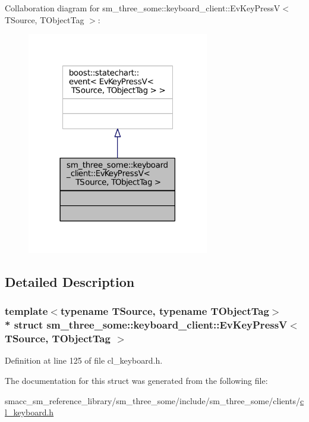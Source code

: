Collaboration diagram for sm\+\_\+three\+\_\+some\+:\+:keyboard\+\_\+client\+:\+:Ev\+Key\+PressV$<$ T\+Source, T\+Object\+Tag $>$\+:
\nopagebreak
\begin{figure}[H]
\begin{center}
\leavevmode
\includegraphics[width=225pt]{structsm__three__some_1_1keyboard__client_1_1EvKeyPressV__coll__graph}
\end{center}
\end{figure}


\subsection{Detailed Description}
\subsubsection*{template$<$typename T\+Source, typename T\+Object\+Tag$>$\\*
struct sm\+\_\+three\+\_\+some\+::keyboard\+\_\+client\+::\+Ev\+Key\+Press\+V$<$ T\+Source, T\+Object\+Tag $>$}



Definition at line 125 of file cl\+\_\+keyboard.\+h.



The documentation for this struct was generated from the following file\+:\begin{DoxyCompactItemize}
\item 
smacc\+\_\+sm\+\_\+reference\+\_\+library/sm\+\_\+three\+\_\+some/include/sm\+\_\+three\+\_\+some/clients/\hyperlink{cl__keyboard_8h}{cl\+\_\+keyboard.\+h}\end{DoxyCompactItemize}
